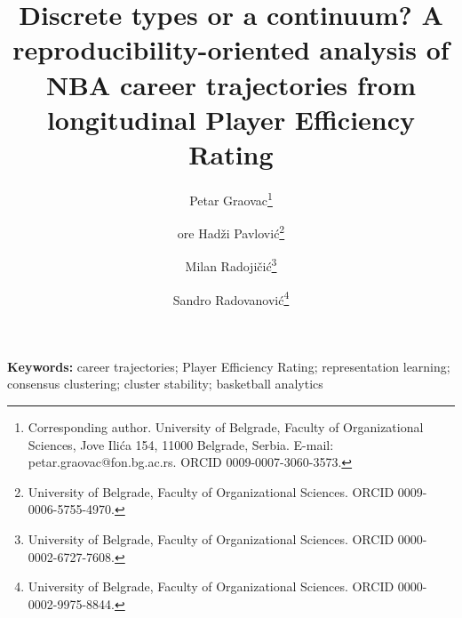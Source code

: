 \documentclass[12pt,a4paper]{article}          %
\title{Discrete types or a continuum? A reproducibility-oriented analysis of NBA career trajectories from longitudinal Player Efficiency Rating}
\author{Petar Graovac\thanks{Corresponding author. University of Belgrade, Faculty of Organizational Sciences, Jove Ili\'ca 154, 11000 Belgrade, Serbia. E-mail: petar.graovac@fon.bg.ac.rs. ORCID 0009-0007-3060-3573.}
\and \DJ or\dj e Had\v{z}i Pavlovi\'c\thanks{University of Belgrade, Faculty of Organizational Sciences. ORCID 0009-0006-5755-4970.}
\and Milan Radoji\v{c}i\'c\thanks{University of Belgrade, Faculty of Organizational Sciences. ORCID 0000-0002-6727-7608.}
\and Sandro Radovanovi\'c\thanks{University of Belgrade, Faculty of Organizational Sciences. ORCID 0000-0002-9975-8844.}}
\date{}
\begin{document}
\maketitle

\begin{abstract}
\noindent 
\end{abstract}

\noindent\textbf{Keywords:} career trajectories; Player Efficiency Rating; representation learning; consensus clustering; cluster stability; basketball analytics













\clearpage
\appendix

\end{document}
